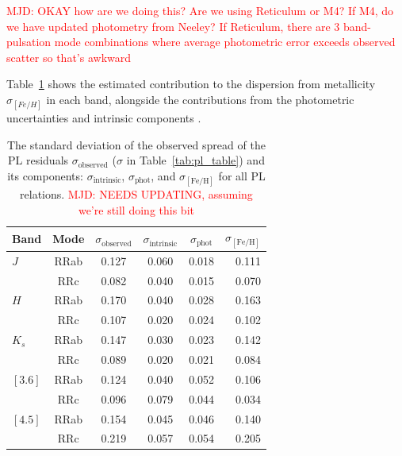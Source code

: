 \documentclass[a4paper,fleqn,usenatbib]{mnras}
\newcommand{\ocen}{$\omega$~Cen\xspace}
\providecommand{\mjdcomment}[1]{{\textcolor{red}{{MJD: #1}}}\xspace}
\begin{document}
\mjdcomment{OKAY how are we doing this? Are we using Reticulum or M4? If M4, do we have updated photometry from Neeley? If Reticulum, there are 3 band-pulsation mode combinations where average photometric error exceeds observed scatter so that's awkward}

Table~\ref{tab:metallicity_sigma} shows the estimated contribution to the dispersion from metallicity $\sigma_{[Fe/H]}$ in each band, alongside the contributions from the photometric uncertainties and intrinsic components \citep[from][for the near-- and mid--IR, respectively]{2015ApJ...808...50M, 2015ApJ...808...11N}. %


\begin{table}
\centering
\caption{The standard deviation of the observed spread of the PL residuals $\sigma_{\text{observed}}$ ($\sigma$ in Table~\ref{tab:pl_table}) and its components: $\sigma_{\text{intrinsic}}$, $\sigma_{\text{phot}}$, and $\sigma_{[\text{Fe/H}]}$ for all PL relations. \mjdcomment{NEEDS UPDATING, assuming we're still doing this bit}}
\label{tab:metallicity_sigma}
\begin{tabular}{lccccr} 
\hline \hline
Band & Mode & $\sigma_{\text{observed}}$ & $\sigma_{\text{intrinsic}}$ & $\sigma_{\text{phot}}$ & $\sigma_{[\text{Fe/H}]}$ \\
\hline
$J$ & RRab & 0.127 & 0.060 & 0.018 & 0.111 \\
  & RRc & 0.082 & 0.040 & 0.015 & 0.070 \\
$H$ & RRab & 0.170 & 0.040 & 0.028 & 0.163 \\
  & RRc & 0.107 & 0.020 & 0.024 & 0.102 \\
$K_s$ & RRab & 0.147 & 0.030 & 0.023 & 0.142 \\
  & RRc & 0.089 & 0.020 & 0.021 & 0.084 \\
$[3.6]$  & RRab & 0.124 & 0.040 & 0.052 & 0.106 \\
  & RRc & 0.096 & 0.079 & 0.044 & 0.034 \\
$[4.5]$& RRab & 0.154 & 0.045 & 0.046 & 0.140 \\
  & RRc & 0.219 & 0.057 & 0.054 & 0.205 \\
\hline
\end{tabular}
\end{table}
\end{document}
